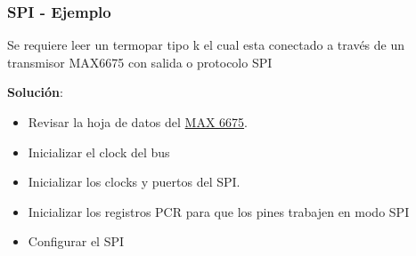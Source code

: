 \documentclass[10.5pt,scale=1.0,t,aspectratio=169,hyperref={pdfpagelabels=false}]{beamer}
\begin{document}
\begin{frame}
	\frametitle{SPI - Ejemplo}
	{\small
		Se requiere leer un termopar tipo k el cual esta conectado a través de un transmisor MAX6675 con salida o protocolo SPI
		
		\textbf{Solución}: 
		
		\begin{itemize}
			\item Revisar la hoja de datos del \href{https://datasheets.maximintegrated.com/en/ds/MAX6675.pdf}{MAX 6675}.
			\item Inicializar el clock del bus
			\item Inicializar los clocks y puertos del SPI.
			\item Inicializar los registros PCR para que los pines trabajen en modo SPI
			\item Configurar el SPI
		\end{itemize}
	}
\end{frame}
\end{document}
